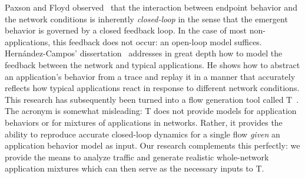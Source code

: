 \documentclass[twocolumn,final]{svjour3}
\newcommand{\caps}[1]{{\smaller{#1}}}
\newcommand{\tmix}{T\caps{MIX}}
\begin{document}
Paxson and Floyd observed~\cite{Paxson95} that the interaction between endpoint behavior and the network conditions is inherently \textit{closed-loop} in the sense that the emergent behavior is governed by a closed feedback loop.
In the case of most non-\caps{TCP} applications, this feedback does not occur: an open-loop model suffices.
Hern\'andez-Campos' dissertation~\cite{Hernandez06:dissertation} addresses in great depth how to model the feedback between the network and typical \caps{TCP} applications.
He shows how to abstract an application's behavior from a \caps{TCP} trace and replay it in a manner that accurately reflects how typical applications react in response to different network conditions.
This research has subsequently been turned into a \caps{TCP} flow generation tool called \tmix~\cite{Weigle06}.
The acronym is somewhat misleading: {\tmix} does not provide models for application behaviors or for mixtures of applications in networks.
Rather, it provides the ability to reproduce accurate closed-loop dynamics for a single \caps{TCP} flow \emph{given} an application behavior model as input.
Our research complements this perfectly: we provide the means to analyze traffic and generate realistic whole-network application mixtures which can then serve as the necessary inputs to {\tmix}.


\end{document}
